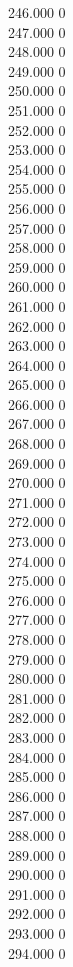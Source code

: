 { 246.000	0 \\
 247.000	0 \\
 248.000	0 \\
 249.000	0 \\
 250.000	0 \\
 251.000	0 \\
 252.000	0 \\
 253.000	0 \\
 254.000	0 \\
 255.000	0 \\
 256.000	0 \\
 257.000	0 \\
 258.000	0 \\
 259.000	0 \\
 260.000	0 \\
 261.000	0 \\
 262.000	0 \\
 263.000	0 \\
 264.000	0 \\
 265.000	0 \\
 266.000	0 \\
 267.000	0 \\
 268.000	0 \\
 269.000	0 \\
 270.000	0 \\
 271.000	0 \\
 272.000	0 \\
 273.000	0 \\
 274.000	0 \\
 275.000	0 \\
 276.000	0 \\
 277.000	0 \\
 278.000	0 \\
 279.000	0 \\
 280.000	0 \\
 281.000	0 \\
 282.000	0 \\
 283.000	0 \\
 284.000	0 \\
 285.000	0 \\
 286.000	0 \\
 287.000	0 \\
 288.000	0 \\
 289.000	0 \\
 290.000	0 \\
 291.000	0 \\
 292.000	0 \\
 293.000	0 \\
 294.000	0 \\
}
